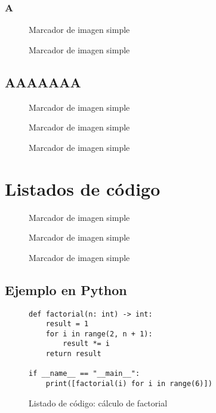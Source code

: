 \documentclass{report}
\begin{document}
\subsection{A}
\begin{figure}[htbp]
  \centering
  \setlength{\fboxsep}{0pt}\fbox{\rule{0pt}{40mm}\rule{80mm}{0pt}}
  \caption{Marcador de imagen simple}
\end{figure}
\begin{figure}[htbp]
  \centering
  \setlength{\fboxsep}{0pt}\fbox{\rule{0pt}{40mm}\rule{80mm}{0pt}}
  \caption{Marcador de imagen simple}
\end{figure}
\section{AAAAAAA}
\begin{figure}[htbp]
  \centering
  \setlength{\fboxsep}{0pt}\fbox{\rule{0pt}{40mm}\rule{80mm}{0pt}}
  \caption{Marcador de imagen simple}
\end{figure}
\begin{figure}[htbp]
  \centering
  \setlength{\fboxsep}{0pt}\fbox{\rule{0pt}{40mm}\rule{80mm}{0pt}}
  \caption{Marcador de imagen simple}
\end{figure}
\begin{figure}[htbp]
  \centering
  \setlength{\fboxsep}{0pt}\fbox{\rule{0pt}{40mm}\rule{80mm}{0pt}}
  \caption{Marcador de imagen simple}
\end{figure}
\chapter{Listados de código}
\begin{figure}[htbp]
  \centering
  \setlength{\fboxsep}{0pt}\fbox{\rule{0pt}{40mm}\rule{80mm}{0pt}}
  \caption{Marcador de imagen simple}
\end{figure}
\begin{figure}[htbp]
  \centering
  \setlength{\fboxsep}{0pt}\fbox{\rule{0pt}{40mm}\rule{80mm}{0pt}}
  \caption{Marcador de imagen simple}
\end{figure}
\begin{figure}[htbp]
  \centering
  \setlength{\fboxsep}{0pt}\fbox{\rule{0pt}{40mm}\rule{80mm}{0pt}}
  \caption{Marcador de imagen simple}
\end{figure}

\section{Ejemplo en Python}
\begin{figure}[htbp]
  \centering
\begin{verbatim}
def factorial(n: int) -> int:
    result = 1
    for i in range(2, n + 1):
        result *= i
    return result

if __name__ == "__main__":
    print([factorial(i) for i in range(6)])
\end{verbatim}
  \caption{Listado de código: cálculo de factorial}
\end{figure}
\end{document}
